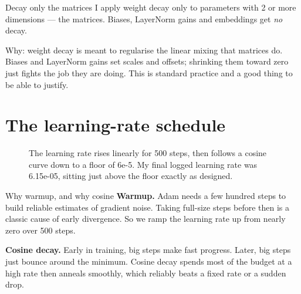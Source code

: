 \documentclass[11pt]{report}
\begin{document}
\begin{implementation}{Decay only the matrices}
I apply weight decay only to parameters with 2 or more dimensions --- the
matrices. Biases, LayerNorm gains and embeddings get \emph{no} decay.

Why: weight decay is meant to regularise the linear mixing that matrices do.
Biases and LayerNorm gains set scales and offsets; shrinking them toward zero just
fights the job they are doing. This is standard practice and a good thing to be
able to justify.
\end{implementation}

\section{The learning-rate schedule}

\begin{figure}[htbp]
\centering
{}
\caption{The learning rate rises linearly for 500 steps, then follows a cosine
curve down to a floor of 6e-5. My final logged learning rate was 6.15e-05,
sitting just above the floor exactly as designed.}
\label{fig:lr}
\end{figure}

\begin{concept}{Why warmup, and why cosine}
\textbf{Warmup.} Adam needs a few hundred steps to build reliable estimates of
gradient noise. Taking full-size steps before then is a classic cause of early
divergence. So we ramp the learning rate up from nearly zero over 500 steps.

\textbf{Cosine decay.} Early in training, big steps make fast progress. Later,
big steps just bounce around the minimum. Cosine decay spends most of the budget
at a high rate then anneals smoothly, which reliably beats a fixed rate or a
sudden drop.
\end{concept}
\end{document}
